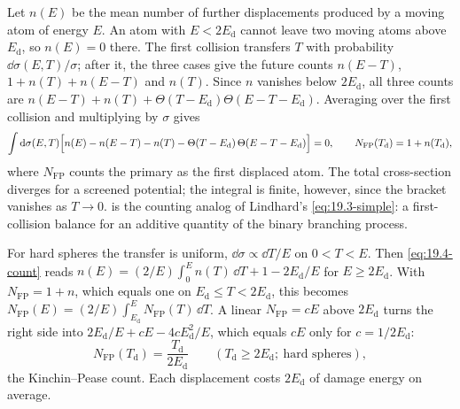 Let $n(E)$ be the mean number of further displacements produced by a moving atom of energy $E$. An atom with $E < 2E_{\mathrm{d}}$ cannot leave two moving atoms above $E_{\mathrm{d}}$, so $n(E) = 0$ there. The first collision transfers $T$ with probability $\dd\sigma(E,T)/\sigma$; after it, the three cases give the future counts $n(E - T)$, $1 + n(T) + n(E - T)$ and $n(T)$. Since $n$ vanishes below $2E_{\mathrm{d}}$, all three counts are $n(E - T) + n(T) + \Theta(T - E_{\mathrm{d}})\Theta(E - T - E_{\mathrm{d}})$. Averaging over the first collision and multiplying by $\sigma$ gives
\begin{equation}
  \int\mathrm{d}\sigma(E,T)\Bigl[n(E) - n(E - T) - n(T) - \Theta(T - E_{\mathrm{d}})\,\Theta(E - T - E_{\mathrm{d}})\Bigr] = 0 , \qquad
  N_{\mathrm{FP}}(T_{\mathrm{d}}) = 1 + n(T_{\mathrm{d}}) ,
  \label{eq:19.4-count}
\end{equation}
where $N_{\mathrm{FP}}$ counts the primary as the first displaced atom. The total cross-section diverges for a screened potential; the integral is finite, however, since the bracket vanishes as $T \to 0$.  is the counting analog of Lindhard's \cref{eq:19.3-simple}: a first-collision balance for an additive quantity of the binary branching process.

For hard spheres the transfer is uniform, $\dd\sigma \propto \dd T/E$ on $0 < T < E$. Then \cref{eq:19.4-count} reads $n(E) = (2/E)\int_0^En(T)\,\dd T + 1 - 2E_{\mathrm{d}}/E$ for $E \ge 2E_{\mathrm{d}}$. With $N_{\mathrm{FP}} = 1 + n$, which equals one on $E_{\mathrm{d}} \le T < 2E_{\mathrm{d}}$, this becomes $N_{\mathrm{FP}}(E) = (2/E)\int_{E_{\mathrm{d}}}^EN_{\mathrm{FP}}(T)\,\dd T$. A linear $N_{\mathrm{FP}} = cE$ above $2E_{\mathrm{d}}$ turns the right side into $2E_{\mathrm{d}}/E + cE - 4cE_{\mathrm{d}}^2/E$, which equals $cE$ only for $c = 1/2E_{\mathrm{d}}$:
\begin{equation}
  N_{\mathrm{FP}}(T_{\mathrm{d}}) = \frac{T_{\mathrm{d}}}{2E_{\mathrm{d}}} \qquad (T_{\mathrm{d}} \ge 2E_{\mathrm{d}};\ \text{hard spheres}) ,
  \label{eq:19.4-KP}
\end{equation}
the Kinchin--Pease count. Each displacement costs $2E_{\mathrm{d}}$ of damage energy on average.

